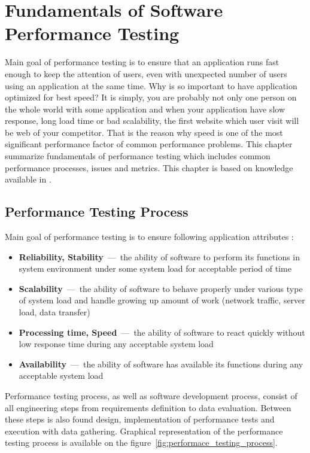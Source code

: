 
\chapter{Fundamentals of Software Performance Testing}
\label{Fundamentals of Software Performance Testing}
Main goal of performance testing is to ensure that an application runs fast enough to keep the attention of users, even with unexpected number of users using an application at the same time. Why is so important to have application optimized for best speed? It is simply, you are probably not only one person on the whole world with some application and when your application have slow response, long load time or bad scalability, the first website which user visit will be web of your competitor. That is the reason why speed is one of the most significant performance factor of common performance problems. This chapter summarize fundamentals of performance testing which includes common performance processes, issues and metrics. This chapter is based on knowledge available in \cite{Molyneaux:TAoAPT, Kurkova:Thesis:2017, DIN:PHD}.


\section{Performance Testing Process}
\label{Performance Testing Process}
Main goal of performance testing is to ensure following application attributes \cite{GAO:MEASURING}:

\begin{itemize}
	\setlength\itemsep{0em}
	\item \textbf{Reliability, Stability} \,---\ the ability of software to perform its functions in system environment under some system load for acceptable period of time
	\item \textbf{Scalability} \,---\ the ability of software to behave properly under various type of system load and handle growing up amount of work (network traffic, server load, data transfer)
	\item \textbf{Processing time, Speed} \,---\ the ability of software to react quickly without low response time during any acceptable system load
	\item \textbf{Availability} \,---\ the ability of software has available its functions during any acceptable system load
\end{itemize}

Performance testing process, as well as software development process, consist of all engineering steps from requirements definition to data evaluation. Between these steps is also found design, implementation of performance tests and execution with data gathering. Graphical representation of the performance testing process is available on the figure~\ref{fig:performace_testing_process}. 

